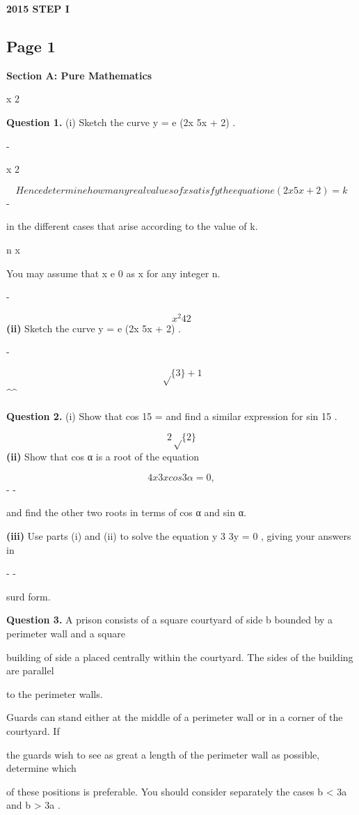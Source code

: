 \documentclass[12pt]{article}
\begin{document}
\begin{center}
{\Large \textbf{2015 STEP I}}
\end{center}

\subsection*{Page 1}
\begin{flushleft}
\bigskip\textbf{Section A: Pure Mathematics}\par
x 2\par
\bigskip\textbf{Question 1.} (i) Sketch the curve y = e (2x 5x + 2) .\par
-\par
x 2\par
\[Hence determine how many real values of x satisfy the equation e (2x 5x + 2) = k\]
-\par
in the different cases that arise according to the value of k.\par
n x\par
You may assume that x e 0 as x for any integer n.\par
\to \to -\infty\par
\[x^2 4 2\]
\textbf{(ii)} Sketch the curve y = e (2x 5x + 2) .\par
-\par
\[\sqrt\{3\} + 1\]
\textasciicircum{}\circ \textasciicircum{}\circ\par
\bigskip\textbf{Question 2.} (i) Show that cos 15 = and find a similar expression for sin 15 .\par
\[2\sqrt\{2\}\]
\textbf{(ii)} Show that cos α is a root of the equation\par
\[4x 3x cos 3α = 0 ,\]
- -\par
and find the other two roots in terms of cos α and sin α.\par
\textbf{(iii)} Use parts (i) and (ii) to solve the equation y 3 3y  = 0 , giving your answers in\par
- -\par
surd form.\par
\bigskip\textbf{Question 3.} A prison consists of a square courtyard of side b bounded by a perimeter wall and a square\par
building of side a placed centrally within the courtyard. The sides of the building are parallel\par
to the perimeter walls.\par
Guards can stand either at the middle of a perimeter wall or in a corner of the courtyard. If\par
the guards wish to see as great a length of the perimeter wall as possible, determine which\par
of these positions is preferable. You should consider separately the cases b < 3a and b > 3a .\par
\end{flushleft}
\end{document}
